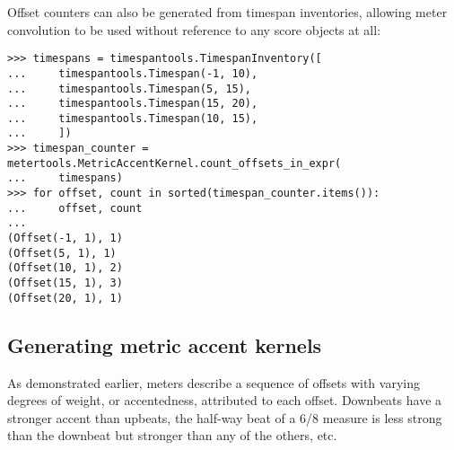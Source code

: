 Offset counters can also be generated from timespan inventories, allowing meter
convolution to be used without reference to any score objects at all:

\begin{comment}
<abjad>
timespans = timespantools.TimespanInventory([
    timespantools.Timespan(-1, 10),
    timespantools.Timespan(5, 15),
    timespantools.Timespan(15, 20),
    timespantools.Timespan(10, 15),
    ])
timespan_counter = metertools.MetricAccentKernel.count_offsets_in_expr(
    timespans)
for offset, count in sorted(timespan_counter.items()):
    offset, count

</abjad>
\end{comment}

\begin{singlespacing}
\vspace{-0.5\baselineskip}
\begin{lstlisting}
>>> timespans = timespantools.TimespanInventory([
...     timespantools.Timespan(-1, 10),
...     timespantools.Timespan(5, 15),
...     timespantools.Timespan(15, 20),
...     timespantools.Timespan(10, 15),
...     ])
>>> timespan_counter = metertools.MetricAccentKernel.count_offsets_in_expr(
...     timespans)
>>> for offset, count in sorted(timespan_counter.items()):
...     offset, count
...
(Offset(-1, 1), 1)
(Offset(5, 1), 1)
(Offset(10, 1), 2)
(Offset(15, 1), 3)
(Offset(20, 1), 1)
\end{lstlisting}
\end{singlespacing}

\subsection{Generating metric accent kernels} %

As demonstrated earlier, meters describe a sequence of offsets with varying
degrees of weight, or accentedness, attributed to each offset. Downbeats have a
stronger accent than upbeats, the half-way beat of a 6/8 measure is less strong
than the downbeat but stronger than any of the others, etc.

\begin{comment}
<abjad>
meter = metertools.Meter((4, 4))
kernel_44 = metertools.MetricAccentKernel.from_meter(meter, denominator=8)
for offset, weight in sorted(kernel_44.kernel.items()):
    print('{!s}\t{!s}'.format(offset, weight))

</abjad>
\end{comment}

